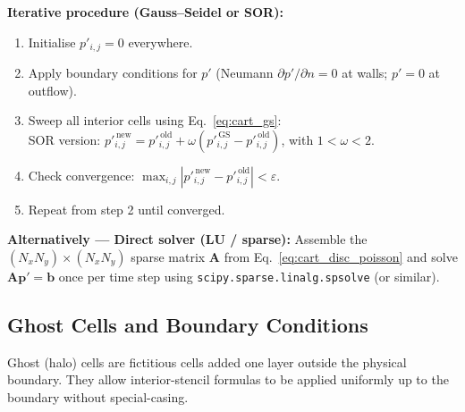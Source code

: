 \textbf{Iterative procedure (Gauss--Seidel or SOR):}
\begin{enumerate}
    \item Initialise $p'_{i,j}=0$ everywhere.
    \item Apply boundary conditions for $p'$ (Neumann $\partial p'/\partial n = 0$ at walls; $p'=0$ at outflow).
    \item Sweep all interior cells using Eq.~\eqref{eq:cart_gs}: \\
          SOR version: $p'^{\,\text{new}}_{i,j} = p'^{\,\text{old}}_{i,j} + \omega\!\left(p'^{\,\text{GS}}_{i,j}-p'^{\,\text{old}}_{i,j}\right)$, with $1 < \omega < 2$.
    \item Check convergence: $\max_{i,j}|p'^{\,\text{new}}_{i,j}-p'^{\,\text{old}}_{i,j}| < \varepsilon$.
    \item Repeat from step 2 until converged.
\end{enumerate}

\textbf{Alternatively --- Direct solver (LU / sparse):}
Assemble the $(N_x N_y)\times(N_x N_y)$ sparse matrix $\mathbf{A}$ from Eq.~\eqref{eq:cart_disc_poisson} and solve $\mathbf{A}\mathbf{p}'=\mathbf{b}$ once per time step using \texttt{scipy.sparse.linalg.spsolve} (or similar).

\subsection{Ghost Cells and Boundary Conditions}

Ghost (halo) cells are fictitious cells added one layer outside the physical boundary.  They allow interior-stencil formulas to be applied uniformly up to the boundary without special-casing.

